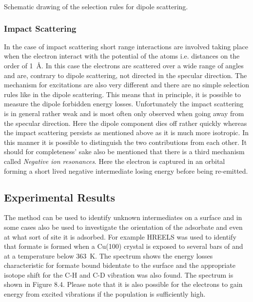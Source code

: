 \vspace*{11cm}

 Schematic drawing of the selection rules for dipole scattering.

\vspace{1cm}
 
\subsubsection{Impact Scattering}
In the case of impact scattering  short range interactions are involved taking  place when the electron interact with the potential of the atoms i.e. distances  on the order of \SI{1}{\angstrom}. In this case the electrons are scattered over a wide range of angles and are, contrary to dipole scattering, not directed in the specular direction. The mechanism for excitations are also very different and there are no simple selection rules like in the dipole scattering. This means that in principle, it is possible to measure the dipole forbidden energy losses. Unfortunately the impact scattering is in general rather weak and is most often only observed when going away from the specular direction. Here the dipole component dies off rather quickly whereas the impact scattering persists as mentioned above as it is much more isotropic. In this manner it is possible to distinguish the two contributions from each other. It should for completeness' sake also be mentioned that there is a third mechanism called \emph{Negative ion resonances}. Here the electron is captured in an orbital forming a short lived negative intermediate losing energy before being re-emitted. 

\subsection{Experimental Results}
The method can be used to identify unknown intermediates on a surface and in some cases also be used to investigate the orientation of the adsorbate and even at what sort of site it is adsorbed. For example HREELS was used to identify that formate is formed when a Cu(100) crystal is exposed to several bars of  and  at a temperature below \SI{363}{K}. The spectrum shows the energy losses characteristic for formate bound bidentate to the surface and the appropriate isotope shift for the C-H and C-D vibration was also found. The spectrum is shown in Figure 8.4. Please note that it is also possible for the electrons to gain energy from excited vibrations if the population is sufficiently high.

